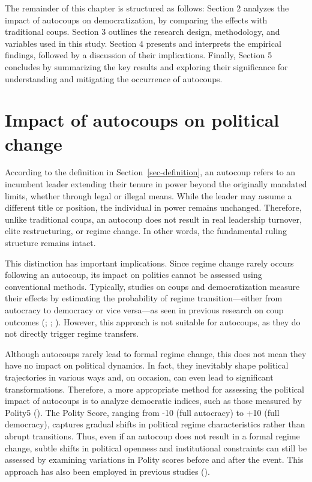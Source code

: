\documentclass[
  12pt,
]{report}
\begin{document}
The remainder of this chapter is structured as follows: Section 2
analyzes the impact of autocoups on democratization, by comparing the
effects with traditional coups. Section 3 outlines the research design,
methodology, and variables used in this study. Section 4 presents and
interprets the empirical findings, followed by a discussion of their
implications. Finally, Section 5 concludes by summarizing the key
results and exploring their significance for understanding and
mitigating the occurrence of autocoups.

\section{Impact of autocoups on political
change}\label{impact-of-autocoups-on-political-change}

According to the definition in Section~\ref{sec-definition}, an autocoup
refers to an incumbent leader extending their tenure in power beyond the
originally mandated limits, whether through legal or illegal means.
While the leader may assume a different title or position, the
individual in power remains unchanged. Therefore, unlike traditional
coups, an autocoup does not result in real leadership turnover, elite
restructuring, or regime change. In other words, the fundamental ruling
structure remains intact.

This distinction has important implications. Since regime change rarely
occurs following an autocoup, its impact on politics cannot be assessed
using conventional methods. Typically, studies on coups and
democratization measure their effects by estimating the probability of
regime transition---either from autocracy to democracy or vice
versa---as seen in previous research on coup outcomes
(;
;
). However, this approach is not
suitable for autocoups, as they do not directly trigger regime
transfers.

Although autocoups rarely lead to formal regime change, this does not
mean they have no impact on political dynamics. In fact, they inevitably
shape political trajectories in various ways and, on occasion, can even
lead to significant transformations. Therefore, a more appropriate
method for assessing the political impact of autocoups is to analyze
democratic indices, such as those measured by Polity5
(). The Polity Score,
ranging from -10 (full autocracy) to +10 (full democracy), captures
gradual shifts in political regime characteristics rather than abrupt
transitions. Thus, even if an autocoup does not result in a formal
regime change, subtle shifts in political openness and institutional
constraints can still be assessed by examining variations in Polity
scores before and after the event. This approach has also been employed
in previous studies ().
\end{document}
